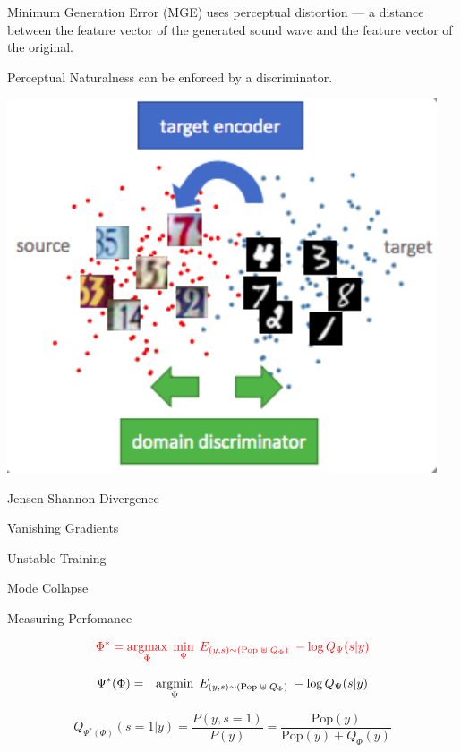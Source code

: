 {\vfill
Minimum Generation Error (MGE) uses {\color{red} perceptual distortion} ---
a distance between the feature vector of the generated sound wave and the
feature vector of the original.

\vfill
{\color{red}Perceptual Naturalness} can be enforced by a discriminator.


\centerline{\includegraphics[width = 5.0in]{../images/AdvDomainAdapt}}


\centerline{Jensen-Shannon Divergence}

\vfill
\centerline{Vanishing Gradients}

\vfill
\centerline{Unstable Training}

\vfill
\centerline{Mode Collapse}

\vfill
\centerline{Measuring Perfomance}


$${\color{red} \Phi^* = \operatorname*{argmax}_\Phi \; \min_\Psi \;E_{(y,s) \sim (\mathrm{Pop}\; \uplus \;Q_\Phi)}\;- \log Q_\Psi(s|y)}$$

\vfill
\begin{eqnarray*}
\Psi^*(\Phi) & = & \operatorname*{argmin}_\Psi \; E_{(y,s) \sim (\mathrm{Pop}\; \uplus \;Q_\Phi)}\;- \log Q_\Psi(s|y)
\end{eqnarray*}

\vfill
$$Q_{\Psi^*(\Phi)}(s=1|y) = \frac{P(y,s=1)}{P(y)} = \frac{\mathrm{Pop}(y)}{\mathrm{Pop}(y) + Q_\Phi(y)}$$

}
